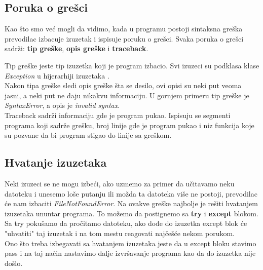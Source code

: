 \documentclass[a4paper]{article}
\begin{document}
\subsection{Poruka o grešci}
Kao što smo već mogli da vidimo, kada u programu postoji sintaksna greška prevodilac izbacuje izuzetak i ispisuje poruku o grešci. Svaka poruka o grešci sadrži: \textbf{tip greške}, \textbf{opis greške} i \textbf{traceback}.

Tip greške jeste tip izuzetka koji je program izbacio. Svi izuzeci su podklasa klase \emph{Exception} u hijerarhiji izuzetaka \cite{excDocPyt}.\\
Nakon tipa greške sledi opis greške šta se desilo, ovi opisi su neki put veoma jasni, a neki put ne daju nikakvu informaciju. U gornjem primeru tip greške je \emph{SyntaxError}, a opis je \emph{invalid syntax}.\\
Traceback sadrži informaciju gde je program pukao. Ispisuju se segmenti programa koji sadrže grešku, broj linije gde je program pukao i niz funkcija koje su pozvane da bi program stigao do linije sa greškom.
\subsection{Hvatanje izuzetaka}
Neki izuzeci se ne mogu izbeći, ako uzmemo za primer da učitavamo neku datoteku i unesemo loše putanju ili možda ta datoteka više ne postoji, prevodilac će nam izbaciti \emph{FileNotFoundError}. Na ovakve greške najbolje je rešiti hvatanjem izuzetaka ununtar programa. To možemo da postignemo sa \textbf{try} i \textbf{except} blokom. Sa try pokušamo da pročitamo datoteku, ako dođe do izuzetka except blok će "uhvatiti" taj izuzetak i na tom mestu reagovati najčešće nekom porukom.\\
Ono što treba izbegavati sa hvatanjem izuzetaka jeste da u except bloku stavimo pass i na taj način nastavimo dalje izvršavanje programa kao da do izuzetka nije došlo\cite{proPyDeb}.
\end{document}

